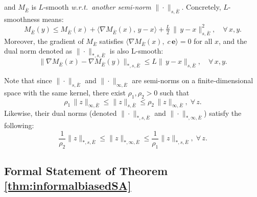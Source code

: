 and \(M_{\overline{E}}\) is \(L\)-smooth \emph{w.r.t.\ another semi-norm} \(\|\cdot\|_{s,\overline{E}}\).  
Concretely, \(L\)-smoothness means:
\begin{equation} \label{eq:lsmooth}
  M_{\overline{E}}(y) \leq M_{\overline{E}}(x)+
  \langle \nabla M_{\overline{E}}(x),\,y - x\rangle+\tfrac{L}{2}\,\|\,y-x\|_{s,\overline{E}}^2,
  \quad
  \forall\,x,y.
\end{equation}
Moreover, the gradient of $M_{\overline{E}}$ satisfies $\langle \nabla M_{\overline{E}}(x),\; c\,\mathbf{e}\rangle = 0$ for all $x$, and the dual norm denoted as \(\|\cdot\|_{*,s,\overline{E}}\) is also L-smooth:
\begin{equation}  \label{eq:duallsmooth}
  \| \nabla M_{\overline{E}}(x) - \nabla M_{\overline{E}}(y)\|_{*,s,\overline{E}} \leq 
   L\|\,y-x\|_{s,\overline{E}},
  \quad
  \forall\,x,y.
\end{equation}

Note that since $\|\cdot\|_{s,\overline{E}}$ and $\|\cdot\|_{\infty,\overline{E}}$ are semi-norms on a finite‐dimensional space with the same kernel, there exist $\rho_1,\rho_2>0$ such that
\begin{equation} \label{eq:normequivalence}
  \rho_1\,\|z\|_{\infty,\overline{E}} \leq \|z\|_{s,\overline{E}} \leq \rho_2\,\|z\|_{\infty,\overline{E}},
  \;
  \forall\,z.
\end{equation}
Likewise, their dual norms (denoted \(\|\cdot\|_{*,s,\overline{E}}\) and \(\|\cdot\|_{*,\infty,\overline{E}}\)) satisfy the following:
\begin{equation} \label{eq:dualnormequivalence}
  \frac{1}{\rho_2}\|z\|_{*,s,\overline{E}} \leq \|z\|_{*,\infty,\overline{E}} \leq \frac{1}{\rho_1}\|z\|_{*,s,\overline{E}}, \;
  \forall\,z.
\end{equation}


\subsection{Formal Statement of Theorem \ref{thm:informalbiasedSA}} \label{appendix4biasedSA}

